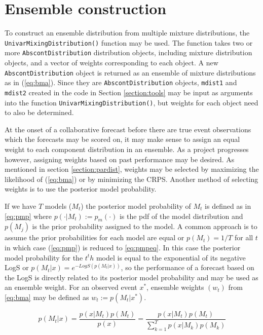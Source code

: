 \documentclass[11pt,notitlepage]{isuthesis}
\begin{document}
\section{Ensemble construction}
\label{section:enscon}


To construct an ensemble distribution from multiple mixture distributions, the 
\texttt{UnivarMixingDistribution()} function may be used. The function takes 
two or more
\texttt{AbscontDistribution} distribution objects, including mixture 
distribution objects, and a vector of weights 
corresponding to each object. A new \texttt{AbscontDistribution} object is 
returned as an ensemble of mixture distributions as in (\ref{eq:bma}). 
Since they are \texttt{AbscontDistribution} objects, \texttt{mdist1} and 
\texttt{mdist2} created in the code
in Section \ref{section:tools} may be input as arguments into the function
\texttt{UnivarMixingDistribution()}, but weights for each object need to also
be determined.

At the onset of a collaborative forecast before there are true event 
observations which the forecasts may be scored on, 
it may make sense to assign an equal weight to each 
component distribution in an ensemble. As a project progresses however, 
assigning weights based on past performance may be desired. As mentioned in 
section \ref{section:pardist}, weights may be selected by maximizing the
likelihood of (\ref{eq:bma}) or by minimizing the CRPS. Another method of 
selecting weights is to use the posterior model probability. 

If we have $T$ models ($M_t$) the posterior model probability of $M_t$ is 
defined as in \eqref{eq:pmp} where $p(\cdot |M_t) := p_m(\cdot)$ is the pdf 
of the model distribution and 
$p(M_j)$ is the prior probability assigned to the model. A common approach is to
assume the prior
probabilities for each model are equal or $p(M_t) = 1/T$ for all $t$ in which 
case
(\ref{eq:pmp}) is reduced to \eqref{eq:pmpeq}. In this case the posterior model 
probability for the $t^th$ model is equal to the exponential of its negative 
LogS or
$p(M_t|x) = e^{-LogS(p(M_t|x))}$, so the performance of a forecast based on the
LogS is directly related to its posterior model probability and may be used 
as an 
ensemble weight. For an observed event $x^*$, ensemble weights $(w_t)$ from 
\eqref{eq:bma} may be defined as $w_t := p(M_t|x^*)$.


\begin{equation}
\label{eq:pmp}
p(M_t|x) = \frac{p(x|M_t)p(M_t)}{p(x)}
         = \frac{p(x|M_t)p(M_t)}{\sum_{k=1}^T p(x|M_k)p(M_k)}
\end{equation}
\end{document}
